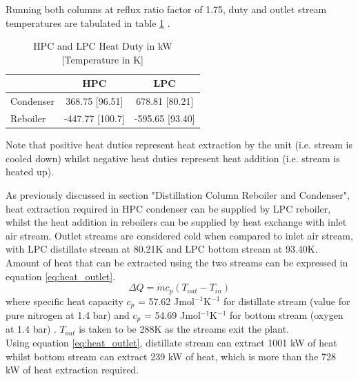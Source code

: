 		\noindent Running both columns at reflux ratio factor of 1.75, duty and outlet stream temperatures are tabulated in table \ref{table:duty} \citep{nist}.
		\begin{table}[H]
        \centering
            \singlespacing
	        \caption{HPC and LPC Heat Duty in kW [Temperature in K]}
	        \label{table:duty}
	
	        \begin{tabular}{|l|cc|}
	        \hline
    	                    & HPC	            & LPC \\    \hline
	        Condenser		& 368.75 [96.51]	& 678.81 [80.21] \\
	        Reboiler  		& -447.77 [100.7]	& -595.65 [93.40] \\    \hline
	        \end{tabular}
	        \vspace{1ex}
	        
	        \raggedright Note that positive heat duties represent heat extraction by the unit (i.e. stream is cooled down) whilst negative heat duties represent heat addition (i.e. stream is heated up).
        \end{table}
        \noindent As previously discussed in section "Distillation Column Reboiler and Condenser", heat extraction required in HPC condenser can be supplied by LPC reboiler, whilst the heat addition in reboilers can be supplied by heat exchange with inlet air stream.
	    Outlet streams are considered cold when compared to inlet air stream, with LPC distillate stream at 80.21K and LPC bottom stream at 93.40K. \\
	    Amount of heat that can be extracted using the two streams can be expressed in equation \ref{eq:heat_outlet}.
	    \begin{equation}
	        \Delta Q = \dot{m}c_p \left(T_{out} - T_{in}\right)
	        \label{eq:heat_outlet}
	    \end{equation}
        where specific heat capacity $c_p$ = 57.62 Jmol$^{-1}$K$^{-1}$ for distillate stream (value for pure nitrogen at 1.4 bar) and $c_p$ = 54.69 Jmol$^{-1}$K$^{-1}$ for bottom stream (oxygen at 1.4 bar) \citep{nist}. $T_{out}$ is taken to be 288K as the streams exit the plant. \\
        Using equation \ref{eq:heat_outlet}, distillate stream can extract 1001 kW of heat whilst bottom stream can extract 239 kW of heat, which is more than the 728 kW of heat extraction required.
